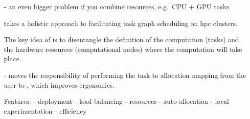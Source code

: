 - an even bigger problem if you combine resources, e.g.\ CPU + GPU tasks





\hyperqueue{} takes a holistic approach to facilitating task graph scheduling on
\gls{hpc} clusters.



The key idea of \hyperqueue{} is to disentangle the definition of the computation (tasks)
and the hardware resources (computational nodes) where the computation will take place.

- moves the responsibility of performing the task to allocation mapping from the user to
\hyperqueue{},
which improves ergonomics.


Features: - deployment - load balancing - resources - auto allocation - local experimentation -
efficiency

%
%
%
%

